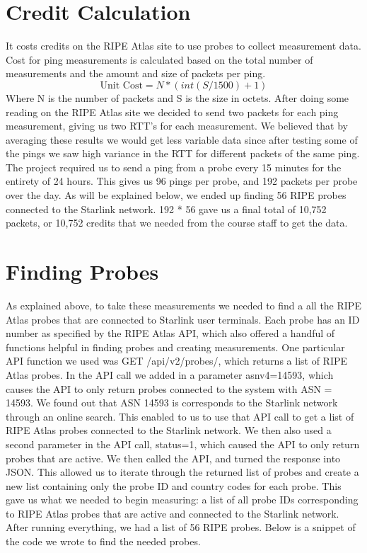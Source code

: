 \documentclass[acmsmall]{acmart}
\begin{document}
\section{Credit Calculation}
It costs credits on the RIPE Atlas site to use probes to collect measurement data. Cost for ping measurements is calculated based on the total number of measurements and the amount and size of packets per ping.  
\begin{equation}
   \text{Unit Cost}= N * (int(S/1500) + 1)
\end{equation}
Where N is the number of packets and S is the size in octets.
After doing some reading on the RIPE Atlas site we decided to send two packets for each ping measurement, giving us two RTT's for each measurement. We believed that by averaging these results we would get less variable data since after testing some of the pings we saw high variance in the RTT for different packets of the same ping. The project required us to send a ping from a probe every 15 minutes for the entirety of 24 hours. This gives us 96 pings per probe, and 192 packets per probe over the day. As will be explained below, we ended up finding 56 RIPE probes connected to the Starlink network. 192 * 56 gave us a final total of 10,752 packets, or 10,752 credits that we needed from the course staff to get the data. 


\section{Finding Probes}

As explained above, to take these measurements we needed to find a all the RIPE Atlas probes that are connected to Starlink user terminals.  Each probe has an ID number as specified by the RIPE Atlas API, which also offered a handful of functions helpful in finding probes and creating measurements. One particular API function we used was GET /api/v2/probes/, which returns a list of RIPE Atlas probes. In the API call we added in a parameter asnv4=14593, which causes the API to only return probes connected to the system with ASN = 14593. We found out that ASN 14593 is corresponds to the Starlink network through an online search. This enabled to us to use that API call to get a list of RIPE Atlas probes connected to the Starlink network. We then also used a second parameter in the API call, status=1, which caused the API to only return probes that are active. We then called the API, and turned the response into JSON. This allowed us to iterate through the returned list of probes and create a new list containing only the probe ID and country codes for each probe. This gave us what we needed to begin measuring: a list of all probe IDs corresponding to RIPE Atlas probes that are active and connected to the Starlink network. After running everything, we had a list of 56 RIPE probes. Below is a snippet of the code we wrote to find the needed probes.
\end{document}
